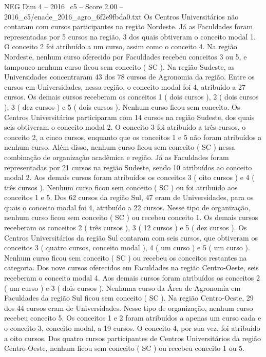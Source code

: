 \begin{textsample}{NEG Dim 4 – 2016\_c5 – Score 2.00 – 2016\_c5/enade\_2016\_agro\_6f2e9fbda0.txt}
Os Centros Universitários não contaram com cursos participantes na região Nordeste.
Já as Faculdades foram representadas por 5 cursos na região, 3 dos quais obtiveram o conceito modal 1.
O conceito 2 foi atribuído a um curso, assim como o conceito 4.
Na região Nordeste, nenhum curso oferecido por Faculdades recebeu conceitos 3 ou 5, e tampouco nenhum curso ficou sem conceito ( SC ).
Na região Sudeste, as Universidades concentraram 43 dos 78 cursos de Agronomia da região.
Entre os cursos em Universidades, nessa região, o conceito modal foi 4, atribuído a 27 cursos.
Os demais cursos receberam os conceitos 1 ( dois cursos ), 2 ( dois cursos ), 3 ( dez cursos ) e 5 ( dois cursos ).
Nenhum curso ficou sem conceito.
Os Centros Universitários participaram com 14 cursos na região Sudeste, dos quais seis obtiveram o conceito modal 2.
O conceito 3 foi atribuído a três cursos, o conceito 2, a cinco cursos, enquanto que os conceitos 1 e 5 não foram atribuídos a nenhum curso.
Além disso, nenhum curso ficou sem conceito ( SC ) nessa combinação de organização acadêmica e região.
Já as Faculdades foram representadas por 21 cursos na região Sudeste, sendo 10 atribuídos ao conceito modal 2.
Aos demais cursos foram atribuídos os conceitos 3 ( oito cursos ) e 4 ( três cursos ).
Nenhum curso ficou sem conceito ( SC ) ou foi atribuído aos conceitos 1 e 5.
Dos 62 cursos da região Sul, 47 eram de Universidades, para os quais o conceito modal foi 4, atribuído a 22 cursos.
Nesse tipo de organização, nenhum curso ficou sem conceito ( SC ) ou recebeu conceito 1.
Os demais cursos receberam os conceitos 2 ( três cursos ), 3 ( 12 cursos ) e 5 ( dez cursos ).
Os Centros Universitários da região Sul contaram com seis cursos, que obtiveram os conceitos 3 ( quatro cursos, conceito modal ), 4 ( um curso ) e 5 ( um curso ).
Nenhum curso ficou sem conceito ( SC ) ou recebeu os conceitos restantes na categoria.
Dos nove cursos oferecidos em Faculdades na região Centro-Oeste, seis receberam o conceito modal 4.
Aos demais cursos foram atribuídos os conceitos 2 ( um curso ) e 3 ( dois cursos ).
Nenhuma curso da Área de Agronomia em Faculdades da região Sul ficou sem conceito ( SC ).
Na região Centro-Oeste, 29 dos 44 cursos eram de Universidades.
Nesse tipo de organização, nenhum curso recebeu conceito 5.
Os conceitos 1 e 2 foram atribuídos a apenas um curso cada e o conceito 3, conceito modal, a 19 cursos.
O conceito 4, por sua vez, foi atribuído a oito cursos.
Dos quatro cursos participantes de Centros Universitários da região Centro-Oeste, nenhum ficou sem conceito ( SC ) ou recebeu conceito 1 ou 5.

\end{textsample}
